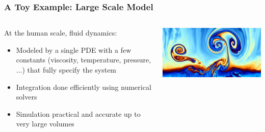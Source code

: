 \documentclass[aspectratio=169, 12pt]{beamer}
\begin{document}
\begin{frame}

    \frametitle{A Toy Example: Large Scale Model}

    \begin{columns}
        
    \begin{column}{.6\textwidth}
        At the human scale, fluid dynamics:

        \begin{itemize}
            \item Modeled by a single PDE with a few constants (viscosity, temperature, pressure, ...) that fully specify the system
            \item Integration done efficiently using numerical solvers
            \item Simulation practical and accurate up to very large volumes
        \end{itemize}

    \end{column}
    \begin{column}{.4\textwidth}
        \includegraphics[width=\textwidth]{images/fluid-dynamics.jpg}
    \end{column}
    \end{columns}

\end{frame}
\end{document}
